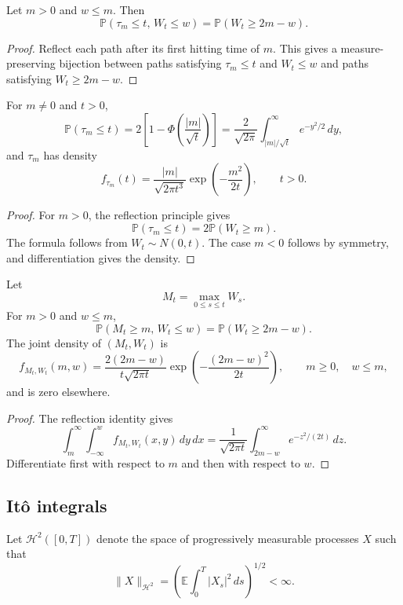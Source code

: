\begin{thm}
Let $m>0$ and $w\leq m$. Then
\[
\mathbb{P}(\tau_m\leq t,\,W_t\leq w)
=
\mathbb{P}(W_t\geq 2m-w).
\]
\end{thm}

\begin{proof}
Reflect each path after its first hitting time of $m$. This gives a measure-preserving bijection between paths satisfying $\tau_m\leq t$ and $W_t\leq w$ and paths satisfying $W_t\geq 2m-w$.
\end{proof}

\begin{thm}
For $m\neq 0$ and $t>0$,
\[
\mathbb{P}(\tau_m\leq t)
=
2\left[1-\Phi\left(\frac{|m|}{\sqrt t}\right)\right]
=
\frac{2}{\sqrt{2\pi}}
\int_{|m|/\sqrt t}^{\infty}e^{-y^2/2}\,dy,
\]
and $\tau_m$ has density
\[
f_{\tau_m}(t)
=
\frac{|m|}{\sqrt{2\pi t^3}}
\exp\left(-\frac{m^2}{2t}\right),
\qquad t>0.
\]
\end{thm}

\begin{proof}
For $m>0$, the reflection principle gives
\[
\mathbb{P}(\tau_m\leq t)
=2\mathbb{P}(W_t\geq m).
\]
The formula follows from $W_t\sim N(0,t)$. The case $m<0$ follows by symmetry, and differentiation gives the density.
\end{proof}

\begin{thm}
Let
\[
M_t=\max_{0\leq s\leq t}W_s.
\]
For $m>0$ and $w\leq m$,
\[
\mathbb{P}(M_t\geq m,\,W_t\leq w)
=
\mathbb{P}(W_t\geq 2m-w).
\]
The joint density of $(M_t,W_t)$ is
\[
f_{M_t,W_t}(m,w)
=
\frac{2(2m-w)}{t\sqrt{2\pi t}}
\exp\left(-\frac{(2m-w)^2}{2t}\right),
\qquad m\geq 0,\quad w\leq m,
\]
and is zero elsewhere.
\end{thm}

\begin{proof}
The reflection identity gives
\[
\int_m^\infty\int_{-\infty}^w
f_{M_t,W_t}(x,y)\,dy\,dx
=
\frac{1}{\sqrt{2\pi t}}
\int_{2m-w}^{\infty}e^{-z^2/(2t)}\,dz.
\]
Differentiate first with respect to $m$ and then with respect to $w$.
\end{proof}

\subsection{It\^o integrals}

Let $\mathcal{H}^2([0,T])$ denote the space of progressively measurable processes $X$ such that
\[
\|X\|_{\mathcal{H}^2}
=
\left(
\mathbb{E}\int_0^T |X_s|^2\,ds
\right)^{1/2}
<\infty.
\]

